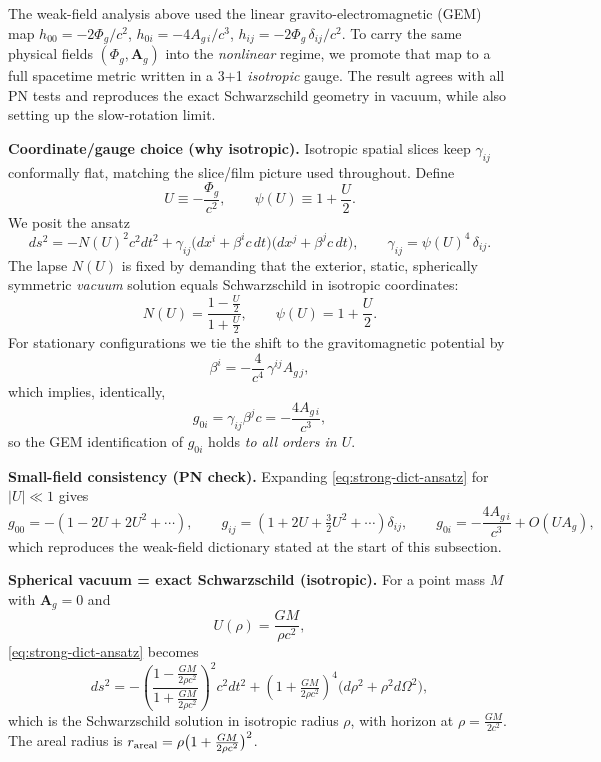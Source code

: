 The weak-field analysis above used the linear gravito-electromagnetic (GEM) map
\(h_{00}=-2\Phi_g/c^2\), \(h_{0i}=-4A_{g\,i}/c^3\), \(h_{ij}=-2\Phi_g\,\delta_{ij}/c^2\).
To carry the same physical fields \((\Phi_g,\mathbf A_g)\) into the \emph{nonlinear} regime, we promote that map to a full spacetime metric written in a 3\(+\)1 \emph{isotropic} gauge. The result agrees with all PN tests and reproduces the exact Schwarzschild geometry in vacuum, while also setting up the slow-rotation limit.

\medskip
\noindent\textbf{Coordinate/gauge choice (why isotropic).}
Isotropic spatial slices keep \(\gamma_{ij}\) conformally flat, matching the slice/film picture used throughout. Define
\[
U\equiv -\frac{\Phi_g}{c^2},\qquad \psi(U)\equiv 1+\frac{U}{2}.
\]
We posit the ansatz
\begin{equation}
ds^2 = -N(U)^2 c^2 dt^2
+ \gamma_{ij}\big(dx^i+\beta^i c\,dt\big)\big(dx^j+\beta^j c\,dt\big),
\qquad \gamma_{ij}=\psi(U)^4\,\delta_{ij}.
\label{eq:strong-dict-ansatz}
\end{equation}
The lapse \(N(U)\) is fixed by demanding that the exterior, static, spherically symmetric \emph{vacuum} solution equals Schwarzschild in isotropic coordinates:
\begin{equation}
N(U)=\frac{1-\tfrac{U}{2}}{1+\tfrac{U}{2}},
\qquad \psi(U)=1+\frac{U}{2}.
\label{eq:Npsi}
\end{equation}
For stationary configurations we tie the shift to the gravitomagnetic potential by
\begin{equation}
\beta^i=-\frac{4}{c^4}\,\gamma^{ij} A_{g\,j},
\label{eq:beta-shift}
\end{equation}
which implies, identically,
\begin{equation}
g_{0i}=\gamma_{ij}\beta^j c=-\frac{4 A_{g\,i}}{c^3},
\label{eq:g0i-allorders}
\end{equation}
so the GEM identification of \(g_{0i}\) holds \emph{to all orders in \(U\)}.

\medskip
\noindent\textbf{Small-field consistency (PN check).}
Expanding \eqref{eq:strong-dict-ansatz} for \(|U|\ll 1\) gives
\[
g_{00}=-(1-2U+2U^2+\cdots),\qquad
g_{ij}=(1+2U+\tfrac{3}{2}U^2+\cdots)\delta_{ij},\qquad
g_{0i}=-\frac{4A_{g\,i}}{c^3}+O(UA_g),
\]
which reproduces the weak-field dictionary stated at the start of this subsection.

\medskip
\noindent\textbf{Spherical vacuum = exact Schwarzschild (isotropic).}
For a point mass \(M\) with \(\mathbf A_g=0\) and
\[
U(\rho)=\frac{GM}{\rho c^2},
\]
\eqref{eq:strong-dict-ansatz} becomes
\[
ds^2=-\left(\frac{1-\tfrac{GM}{2\rho c^2}}{1+\tfrac{GM}{2\rho c^2}}\right)^{\!2}c^2dt^2
+\left(1+\tfrac{GM}{2\rho c^2}\right)^{\!4}\big(d\rho^2+\rho^2 d\Omega^2\big),
\]
which is the Schwarzschild solution in isotropic radius \(\rho\), with horizon at \(\rho=\tfrac{GM}{2c^2}\).
The areal radius is \(r_{\rm areal}=\rho\big(1+\tfrac{GM}{2\rho c^2}\big)^{2}\).

